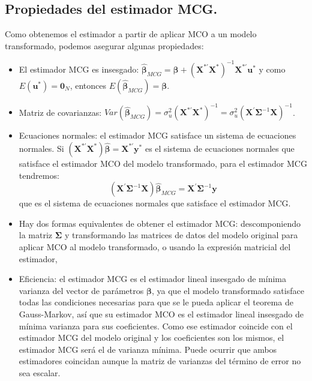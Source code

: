 \subsection{Propiedades del estimador MCG.}

Como obtenemos el estimador a partir de aplicar MCO a un modelo transformado,
podemos asegurar algunas propiedades:
\begin{itemize}
\item El estimador MCG es insesgado: $\hat{\boldsymbol{\beta}}_{MCG}=\boldsymbol{\beta}+\left(\boldsymbol{X}^{*\prime}\boldsymbol{X}^{*}\right)^{-1}\boldsymbol{X}^{*\prime}\boldsymbol{u}^{*}$
y como $E\left(\boldsymbol{u}^{*}\right)=\boldsymbol{0}_{N}$, entonces
$E\left(\hat{\boldsymbol{\beta}}_{MCG}\right)=\boldsymbol{\beta}$.
\item Matriz de covarianzas: $Var\left(\hat{\boldsymbol{\beta}}_{MCG}\right)=\sigma_{u}^{2}\left(\boldsymbol{X}^{*\prime}\boldsymbol{X}^{*}\right)^{-1}=\sigma_{u}^{2}\left(\boldsymbol{X}^{\prime}\boldsymbol{\Sigma}^{-1}\boldsymbol{X}\right)^{-1}$.
\item Ecuaciones normales: el estimador MCG satisface un sistema de ecuaciones
normales. Si $\left(\boldsymbol{X}^{*\prime}\boldsymbol{X}^{*}\right)\hat{\boldsymbol{\beta}}=\boldsymbol{X}^{*\prime}\boldsymbol{y}^{*}$
es el sistema de ecuaciones normales que satisface el estimador MCO
del modelo transformado, para el estimador MCG tendremos:
\[
\left(\boldsymbol{X}^{\prime}\boldsymbol{\Sigma}^{-1}\boldsymbol{X}\right)\hat{\boldsymbol{\beta}}_{MCG}=\boldsymbol{X}^{\prime}\boldsymbol{\Sigma}^{-1}\boldsymbol{y}
\]
 que es el sistema de ecuaciones normales que satisface el estimador
MCG.
\item Hay dos formas equivalentes de obtener el estimador MCG: descomponiendo
la matriz $\boldsymbol{\Sigma}$ y transformando las matrices de datos
del modelo original para aplicar MCO al modelo transformado, o usando
la expresi\'on matricial del estimador,
\item Eficiencia: el estimador MCG es el estimador lineal insesgado de m\'inima
varianza del vector de par\'ametros $\boldsymbol{\beta}$, ya que el
modelo transformado satisface todas las condiciones necesarias para
que se le pueda aplicar el teorema de Gauss-Markov, as\'i que su estimador
MCO es el estimador lineal insesgado de m\'inima varianza para sus coeficientes.
Como ese estimador coincide con el estimador MCG del modelo original
y los coeficientes son los mismos, el estimador MCG ser\'a el de varianza
m\'inima. Puede ocurrir que ambos estimadores coincidan aunque la matriz
de varianzas del t\'ermino de error no sea escalar.
\end{itemize}

